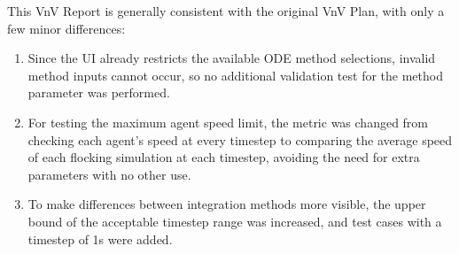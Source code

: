 \documentclass[12pt, titlepage]{article}
\begin{document}
\begin{enumerate}
  This VnV Report is generally consistent with the original VnV Plan, with 
  only a few minor differences:
  \begin{enumerate}
  \item Since the UI already restricts the available ODE method selections, 
  invalid method inputs cannot occur, so no additional validation test for the 
  method parameter was performed.
  \item For testing the maximum agent speed limit, the metric was changed from 
  checking each agent's speed at every timestep to comparing the average speed 
  of each flocking simulation at each timestep, avoiding the need for extra 
  parameters with no other use.
  \item To make differences between integration methods more visible, the upper 
  bound of the acceptable timestep range was increased, and test cases with a 
  timestep of 1s were added.
  \end{enumerate}
\end{enumerate}
\end{document}
